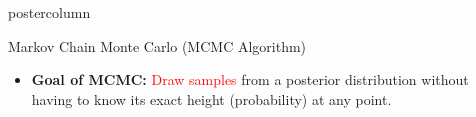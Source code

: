\documentclass[final]{beamer}\usepackage[]{graphicx}\usepackage[]{color}
\newcommand{\red}{\textcolor{red}}
\begin{document}
{\begin{frame}
\begin{columns}
\begin{column}{.33\textwidth}
\begin{beamercolorbox}[center,wd=\textwidth]{postercolumn}
\begin{minipage}[T]{.97\textwidth}
{%
\begin{block}{Markov Chain Monte Carlo (MCMC Algorithm)}


	\begin{itemize}
			\item \textbf{Goal of MCMC:} \red{Draw samples} from a posterior distribution without having to know its exact height (probability) at any point.
			\vspace{0.3cm}

		  \vspace{0.2cm}
		  
	 
	  
		  
		

\end{itemize}
\end{block}}
\end{minipage}
\end{beamercolorbox}
\end{column}
\end{columns}
\end{frame}}
\end{document}
